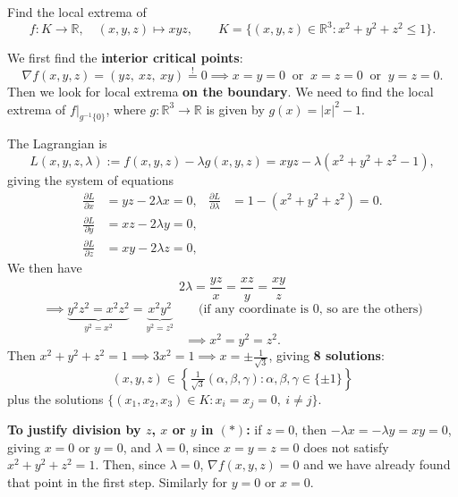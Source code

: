 \begin{exercise}
\label{ex:xyz_on_ball}
Find the local extrema of
\[f : K \to \mathbb{R}, \quad (x,y,z) \mapsto xyz, \qquad K = \{(x,y,z) \in \mathbb{R}^3 : x^2+y^2+z^2 \leq 1\}.\]
\end{exercise}

\begin{exercisesolution}
We first find the \textbf{interior critical points}:
\[\nabla f(x,y,z) = (yz,\ xz,\ xy) \overset{!}{=} 0 \implies x = y = 0 \ \text{ or } \ x = z = 0 \ \text{ or } \ y = z = 0.\]
Then we look for local extrema \textbf{on the boundary}. We need to find the local extrema of
$f|_{g^{-1}\{0\}}$, where $g : \mathbb{R}^3\to\mathbb{R}$ is given by $g(x) = |x|^2 - 1$.

The Lagrangian is
\[L(x,y,z,\lambda) := f(x,y,z) - \lambda g(x,y,z) = xyz - \lambda(x^2+y^2+z^2-1),\]
giving the system of equations
\[
\begin{aligned}
\frac{\partial L}{\partial x} &= yz - 2\lambda x = 0, & \frac{\partial L}{\partial \lambda} &= 1 - (x^2+y^2+z^2) = 0. \\
\frac{\partial L}{\partial y} &= xz - 2\lambda y = 0, \\
\frac{\partial L}{\partial z} &= xy - 2\lambda z = 0,
\end{aligned}
\]
We then have
\begin{equation*}
2\lambda = \frac{yz}{x} = \frac{xz}{y} = \frac{xy}{z} \tag{$*$}
\end{equation*}
\[\implies \underbrace{y^2z^2 = x^2z^2}_{y^2 = x^2} = \underbrace{x^2y^2}_{y^2 = z^2} \qquad \text{(if any coordinate is 0, so are the others)}\]
\[\implies x^2 = y^2 = z^2.\]
Then $x^2+y^2+z^2 = 1 \implies 3x^2 = 1 \implies x = \pm\frac{1}{\sqrt{3}}$, giving
\textbf{8 solutions}:
\[(x,y,z) \in \left\{\tfrac{1}{\sqrt{3}}(\alpha,\beta,\gamma) : \alpha,\beta,\gamma \in \{\pm 1\}\right\}\]
plus the solutions $\{(x_1,x_2,x_3) \in K : x_i = x_j = 0,\ i \neq j\}$.

\textbf{To justify division by $z$, $x$ or $y$ in $(*)$:} if $z = 0$, then
$-\lambda x = -\lambda y = xy = 0$, giving $x = 0$ or $y = 0$, and $\lambda = 0$, since
$x = y = z = 0$ does not satisfy $x^2+y^2+z^2 = 1$. Then, since $\lambda = 0$,
$\nabla f(x,y,z) = 0$ and we have already found that point in the first step. Similarly for
$y = 0$ or $x = 0$.


\end{exercisesolution}
